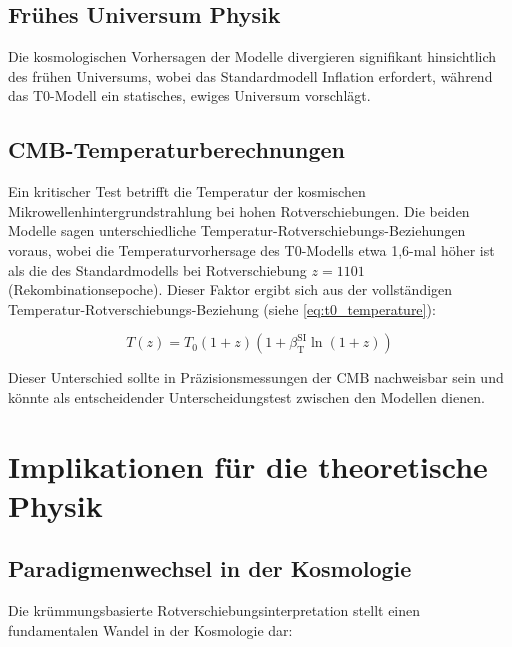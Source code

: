 \documentclass[12pt,a4paper]{article}
\newcommand{\betaT}{\beta_{\text{T}}}
\begin{document}
	\subsection{Frühes Universum Physik}
	\label{subsec:early_universe_tests}
	
	Die kosmologischen Vorhersagen der Modelle divergieren signifikant hinsichtlich des frühen Universums, wobei das Standardmodell Inflation\cite{guth1981} erfordert, während das T0-Modell ein statisches, ewiges Universum vorschlägt\cite{pascher_part2_2025}.
	
	\subsection{CMB-Temperaturberechnungen}
	\label{subsec:cmb_tests}
	
	Ein kritischer Test betrifft die Temperatur der kosmischen Mikrowellenhintergrundstrahlung bei hohen Rotverschiebungen\cite{fixsen2009}. Die beiden Modelle sagen unterschiedliche Temperatur-Rotverschiebungs-Beziehungen voraus\cite{pascher_temp_2025}, wobei die Temperaturvorhersage des T0-Modells etwa 1,6-mal höher ist als die des Standardmodells bei Rotverschiebung $z = 1101$ (Rekombinationsepoche). Dieser Faktor ergibt sich aus der vollständigen Temperatur-Rotverschiebungs-Beziehung (siehe \cref{eq:t0_temperature}):
	
	\begin{equation}
		\label{eq:detailed_temp}
		T(z) = T_0 (1+z)(1 + \betaT^{\text{SI}} \ln(1+z))
	\end{equation}
	
	Dieser Unterschied sollte in Präzisionsmessungen der CMB nachweisbar sein und könnte als entscheidender Unterscheidungstest zwischen den Modellen dienen\cite{pascher_temp_2025}.
	
	\section{Implikationen für die theoretische Physik}
	\label{sec:implications}
	
	\subsection{Paradigmenwechsel in der Kosmologie}
	\label{subsec:paradigm_shift}
	
	Die krümmungsbasierte Rotverschiebungsinterpretation stellt einen fundamentalen Wandel in der Kosmologie dar\cite{pascher_vereinheitlichung_2025}:
	
\end{document}
